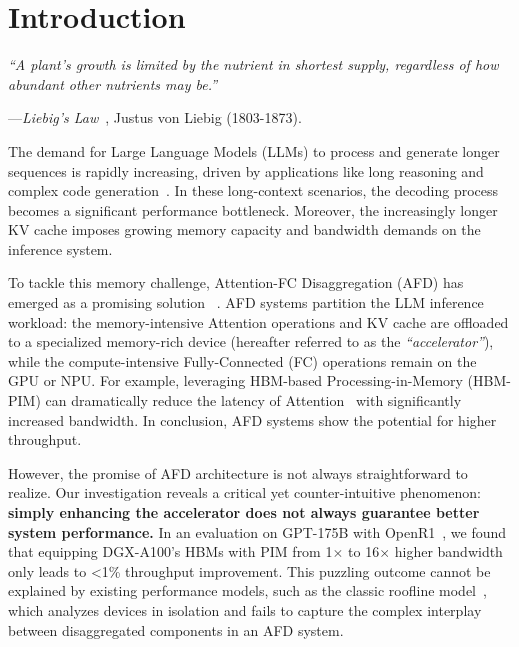 \section{Introduction}
\label{sec:intro}



\emph{``A plant's growth is limited by the nutrient in shortest supply, regardless of how abundant other nutrients may be.''}
\begin{flushright}
  ---\emph{Liebig's Law}~\cite{liebigslaw}, Justus von Liebig (1803-1873).
\end{flushright}




The demand for Large Language Models (LLMs) to process and generate longer sequences 
is rapidly increasing, driven by applications like long reasoning and complex code generation~\cite{deepseekai2025deepseekr1,plaat2024reasoning,huang2023reasoning,zhou2024survey,zhong2024evaluation,grattafiori2024llama3}.
In these long-context scenarios, the decoding process becomes a significant performance bottleneck.
Moreover, the increasingly longer KV cache imposes growing memory capacity and bandwidth demands on the inference system.


To tackle this memory challenge, Attention-FC Disaggregation (AFD) has emerged as a promising solution
~\cite{step3blog,step3system,heo2024neupims,park2024attacc,he2025papi,jiang2024neo,zhu2025megascaleinfer}.
AFD systems partition the LLM inference workload: the memory-intensive Attention operations and KV cache are
offloaded to a specialized memory-rich device (hereafter referred to as the \textit{``accelerator''}), while the compute-intensive
Fully-Connected (FC) operations remain on the GPU or NPU.
For example, leveraging HBM-based Processing-in-Memory (HBM-PIM) can dramatically
reduce the latency of Attention~\cite{heo2024neupims,park2024attacc,he2025papi} with significantly increased bandwidth.
In conclusion, AFD systems show the potential for higher throughput.

However, the promise of AFD architecture is not always straightforward to realize.
Our investigation reveals a critical yet counter-intuitive phenomenon: 
\textbf{simply enhancing the accelerator does not always guarantee better system performance.}
In an evaluation on GPT-175B with OpenR1~\cite{open-r1}, we found that equipping DGX-A100's HBMs with PIM from 1$\times$ to 16$\times$ higher bandwidth only leads to \textless 1\% throughput improvement.
This puzzling outcome cannot be explained by existing performance models, such as the classic roofline model~\cite{roofline},
which analyzes devices in isolation and fails to capture the complex interplay between disaggregated components in an AFD system.

